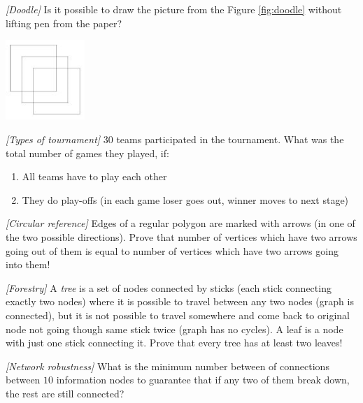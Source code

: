 \begin{problem}
\textit{[Doodle]}
Is it possible to draw the picture from the Figure \ref{fig:doodle} without lifting pen from the paper?
\begin{center}
\includegraphics[width=3cm]{doodle.png}
\label{fig:doodle}
\end{center} 
\end{problem}
%

\begin{problem}
\textit{[Types of tournament]}
30 teams participated in the tournament. What was the total number of games they played, if:
\begin{enumerate}
\item All teams have to play each other
\item They do play-offs (in each game loser goes out, winner moves to next stage)
\end{enumerate}
\end{problem}
%

\begin{problem}
\textit{[Circular reference]}
Edges of a regular polygon are marked with arrows (in one of the two possible directions). Prove that number of vertices which have two arrows going out of them is equal to number of vertices which have two arrows going into them!
\end{problem}
%

\begin{problem}
\textit{[Forestry]}
A \textit{tree} is a set of nodes connected by sticks (each stick connecting exactly two nodes) where it is possible to travel between any two nodes (graph is connected), but it is not possible to travel somewhere and come back to original node not going though same stick twice (graph has no cycles).  A leaf is a node with just one stick connecting it. Prove that every tree has at least two leaves!
\end{problem}
%

\begin{problem}
\textit{[Network robustness]}
What is the minimum number between of connections between $10$ information nodes to guarantee that if any two of them break down, the rest are still connected? 
\end{problem}
%



